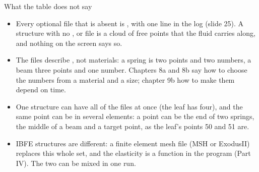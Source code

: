 \documentclass[aspectratio=169,11pt]{beamer}
\begin{document}
\begin{frame}{What the table does not say}
\begin{itemize}
  \item Every optional file that is absent is , with one line in the log (slide 25). A structure with no ,  or  file is a cloud of free points that the fluid carries along, and nothing on the screen says so.
  \item The files describe , not materials: a spring is two points and two numbers, a beam three points and one number. Chapters 8a and 8b say how to choose the numbers from a material and a size; chapter 9b how to make them depend on time.
  \item One structure can have all of the files at once (the leaf has four), and the same point can be in several elements: a point can be the end of two springs, the middle of a beam and a target point, as the leaf's points 50 and 51 are.
  \item IBFE structures are different: a finite element mesh file (MSH or ExodusII) replaces this whole set, and the elasticity is a function in the program (Part IV). The two can be mixed in one run.
\end{itemize}
\end{frame}
\end{document}
